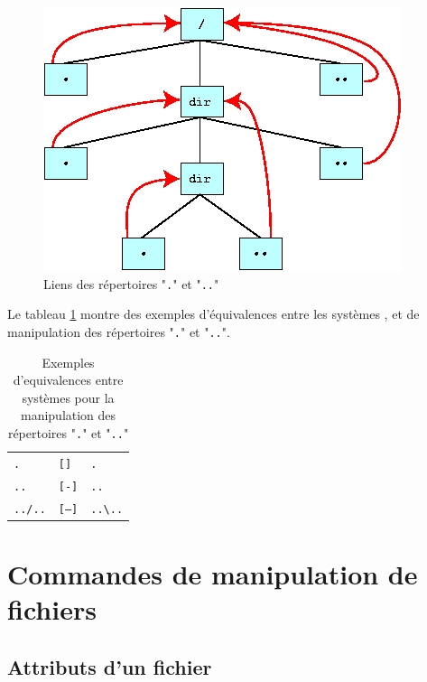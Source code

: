 \begin{figure}[hbtp]
\centering
\includegraphics{./_Images/cmds-unix/dotdirs.jpg}
\caption{\label{fig-cmds-dotdirs}Liens des r{\'e}pertoires "{\tt .}" et
"{\tt ..}"}
\end{figure}

Le tableau \ref{tab-cmds-dotdirs} montre des exemples d'{\'e}quivalences
entre les syst{\`e}mes {\Unix}, {\OpenVMS} et {\DOS} de manipulation des
r{\'e}pertoires "{\tt .}" et "{\tt ..}".

\begin{table}[hbtp]
\centering
\begin{tabular}{|l|l|l|}
	\hline
	{\Unix}		&	{\OpenVMS}	&	{\DOS}	\\
	\hline \hline
	{\tt .}		&	{\tt []}	&	{\tt .}			\\
	{\tt ..}	&	{\tt [-]}	&	{\tt ..}		\\
	{\tt ../..}	&	{\tt [--]}	&	\verb=..\..=	\\
	\hline
\end{tabular}
\caption{\label{tab-cmds-dotdirs}Exemples d'equivalences entre syst{\`e}mes pour
la manipulation des r{\'e}pertoires "{\tt .}" et "{\tt ..}"}
\end{table}

\section{Commandes de manipulation de fichiers}

\subsection{Attributs d'un fichier}

